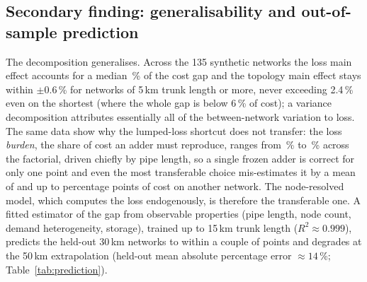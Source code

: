 \documentclass[a4paper,fleqn]{cas-sc}
\begin{document}
\subsection{Secondary finding: generalisability and out-of-sample prediction}
\label{subsec:generalis}
The decomposition generalises. Across the 135 synthetic networks the loss main effect accounts
for a median \,\% of the cost gap and the topology main effect stays
within $\pm$0.6\,\% for networks of 5\,km trunk length or more, never exceeding 2.4\,\% even on
the shortest (where the whole gap is below 6\,\% of cost); a variance decomposition attributes
essentially all of the between-network variation to loss. The same data show why the lumped-loss
shortcut does not transfer: the loss \emph{burden}, the share of cost an adder must reproduce,
ranges from \,\% to \,\% across the factorial,
driven chiefly by pipe length, so a single frozen adder is correct for only one point and even
the most transferable choice mis-estimates it by a mean of  and up to
 percentage points of cost on another network. The node-resolved
model, which computes the loss endogenously, is therefore the transferable one. A fitted
estimator of the gap from observable properties (pipe length, node count, demand heterogeneity,
storage), trained up to 15\,km trunk length ($R^2\approx0.999$), predicts the held-out 30\,km
networks to within a couple of points and degrades at the 50\,km extrapolation (held-out mean
absolute percentage error $\approx14$\,\%; Table~\ref{tab:prediction}).
\end{document}
